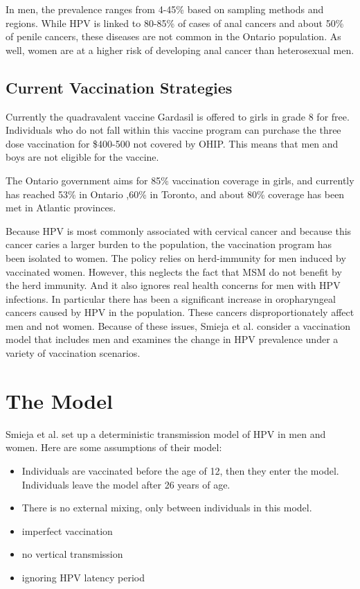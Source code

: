 \documentclass[12pt]{article}
\begin{document}
In men, the prevalence ranges from 4-45\% based on sampling methods and regions.  While HPV is linked to 80-85\% of cases of anal cancers and about 50\% of penile cancers, these diseases are not common in the Ontario population.  As well, women are at a higher risk of developing anal cancer than heterosexual men.  

\subsection{Current Vaccination Strategies}

Currently the quadravalent vaccine Gardasil is offered to girls in grade 8 for free.  Individuals who do not fall within this vaccine program can purchase the three dose vaccination for \$400-500 not covered by OHIP.  This means that men and boys are not eligible for the vaccine. 

The Ontario government aims for 85\% vaccination coverage in girls, and currently has reached 53\% in Ontario ,60\% in Toronto, and about 80\% coverage has been met in Atlantic provinces.  

Because HPV is most commonly associated with cervical cancer and because this cancer caries a larger burden to the population, the vaccination program has been isolated to women. The policy relies on herd-immunity for men induced by vaccinated women.  However, this neglects the fact that MSM do not benefit by the herd immunity.  And it also ignores real health concerns for men with HPV infections.  In particular there has been a significant increase in oropharyngeal cancers caused by HPV in the population.  These cancers disproportionately affect men and not women.  Because of these issues, Smieja et al. consider a vaccination model that includes men and examines the change in HPV prevalence under a variety of vaccination scenarios. 

\section{The Model}

Smieja et al. set up a deterministic transmission model of HPV in men and women.  Here are some assumptions of their model:
\begin{itemize}
\item Individuals are vaccinated before the age of 12, then they enter the model.  Individuals leave the model after 26 years of age. 
\item There is no external mixing, only between individuals in this model. 
\item imperfect vaccination
\item no vertical transmission
\item ignoring HPV latency period
\end{itemize}
\end{document}
